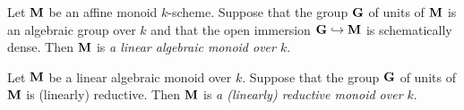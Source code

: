 \begin{definition}
Let $\mathbf{M}$ be an affine monoid $k$-scheme. Suppose that the group $\mathbf{G}$ of units of $\mathbf{M}$ is an algebraic group over $k$ and that the open immersion $\mathbf{G}\hookrightarrow \mathbf{M}$ is schematically dense. Then $\mathbf{M}$ is \textit{a linear algebraic monoid over $k$}.
\end{definition}

\begin{definition}
Let $\mathbf{M}$ be a linear algebraic monoid over $k$. Suppose that the group $\mathbf{G}$ of units of $\mathbf{M}$ is (linearly) reductive. Then $\mathbf{M}$ is \textit{a (linearly) reductive monoid over $k$}.
\end{definition}







































\small



